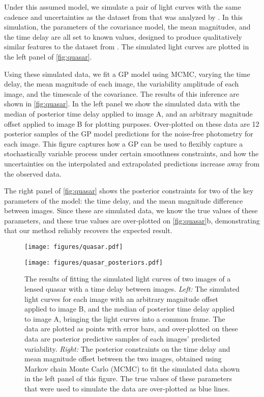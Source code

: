 \documentclass[letterpaper]{ar-1col}
\begin{document}
Under this assumed model, we simulate a pair of light curves with the same cadence and uncertainties as the dataset from \citet{1989A&A...215....1V} that was analyzed by \citet{prh92a}.
In this simulation, the parameters of the covariance model, the mean magnitudes, and the time delay are all set to known values, designed to produce qualitatively similar features to the dataset from \citet{1989A&A...215....1V}.
The simulated light curves are plotted in the left panel of \autoref{fig:quasar}.

Using these simulated data, we fit a GP model using MCMC, varying the time delay, the mean magnitude of each image, the variability amplitude of each image, and the timescale of the covariance.
The results of this inference are shown in \autoref{fig:quasar}.
In the left panel we show the simulated data with the median of posterior time delay applied to image A, and an arbitrary magnitude offset applied to image B for plotting purposes.
Over-plotted on these data are 12 posterior samples of the GP model predictions for the noise-free photometry for each image.
This figure captures how a GP can be used to flexibly capture a stochastically variable process under certain smoothness constraints, and how the uncertainties on the interpolated and extrapolated predictions increase away from the observed data.

The right panel of \autoref{fig:quasar} shows the posterior constraints for two of the key parameters of the model: the time delay, and the mean magnitude difference between images.
Since these are simulated data, we know the true values of these parameters, and these true values are over-plotted on \autoref{fig:quasar}b, demonstrating that our method reliably recovers the expected result.

\begin{figure}[ht]
  \centering
  \begin{minipage}[t]{0.5\linewidth}
    \texttt{[image: figures/quasar.pdf]}
  \end{minipage} \hfill
  \begin{minipage}[t]{0.44\linewidth}
    \texttt{[image: figures/quasar\_posteriors.pdf]}
  \end{minipage}
  \caption{The results of fitting the simulated light curves of two images of a lensed quasar with a time delay between images.
  \emph{Left:} The simulated light curves for each image with an arbitrary magnitude offset applied to image B, and the median of posterior time delay applied to image A, bringing the light curves into a common frame.
  The data are plotted as points with error bars, and over-plotted on these data are posterior predictive samples of each images' predicted variability.
  \emph{Right:} The posterior constraints on the time delay and mean magnitude offset between the two images, obtained using Markov chain Monte Carlo (MCMC) to fit the simulated data shown in the left panel of this figure.
  The true values of these parameters that were used to simulate the data are over-plotted as blue lines.}
  \label{fig:quasar}
\end{figure}
\end{document}
